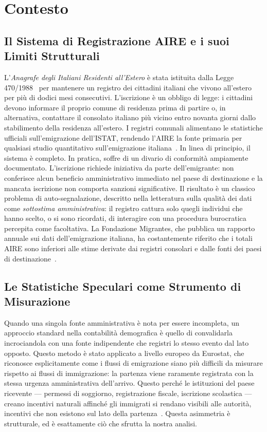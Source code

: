 \section{Contesto}\label{sec:background}

\subsection{Il Sistema di Registrazione AIRE e i suoi Limiti Strutturali}
L'\emph{Anagrafe degli Italiani Residenti all'Estero} è stata istituita dalla Legge 470/1988~\cite{legge470_1988} per mantenere un registro dei cittadini italiani che vivono all'estero per più di dodici mesi consecutivi.
L'iscrizione è un obbligo di legge: i cittadini devono informare il proprio comune di residenza prima di partire o, in alternativa, contattare il consolato italiano più vicino entro novanta giorni dallo stabilimento della residenza all'estero.
I registri comunali alimentano le statistiche ufficiali sull'emigrazione dell'ISTAT, rendendo l'AIRE la fonte primaria per qualsiasi studio quantitativo sull'emigrazione italiana~\cite{istat_migrazioni2023}.
In linea di principio, il sistema è completo.
In pratica, soffre di un divario di conformità ampiamente documentato.
L'iscrizione richiede iniziativa da parte dell'emigrante: non conferisce alcun beneficio amministrativo immediato nel paese di destinazione e la mancata iscrizione non comporta sanzioni significative.
Il risultato è un classico problema di auto-segnalazione, descritto nella letteratura sulla qualità dei dati come \emph{sottostima amministrativa}: il registro cattura solo quegli individui che hanno scelto, o si sono ricordati, di interagire con una procedura burocratica percepita come facoltativa.
La Fondazione Migrantes, che pubblica un rapporto annuale sui dati dell'emigrazione italiana, ha costantemente riferito che i totali AIRE sono inferiori alle stime derivate dai registri consolari e dalle fonti dei paesi di destinazione~\cite{migrantes2022}.
\subsection{Le Statistiche Speculari come Strumento di Misurazione}
Quando una singola fonte amministrativa è nota per essere incompleta, un approccio standard nella contabilità demografica è quello di convalidarla incrociandola con una fonte indipendente che registri lo stesso evento dal lato opposto.
Questo metodo è stato applicato a livello europeo da Eurostat, che riconosce esplicitamente come i flussi di emigrazione siano più difficili da misurare rispetto ai flussi di immigrazione: la partenza viene raramente registrata con la stessa urgenza amministrativa dell'arrivo.
Questo perché le istituzioni del paese ricevente — permessi di soggiorno, registrazione fiscale, iscrizione scolastica — creano incentivi naturali affinché gli immigrati si rendano visibili alle autorità, incentivi che non esistono sul lato della partenza~\cite{eurostat_migration_explained2023, ec_regulation_862_2007}.
Questa asimmetria è strutturale, ed è esattamente ciò che sfrutta la nostra analisi.
